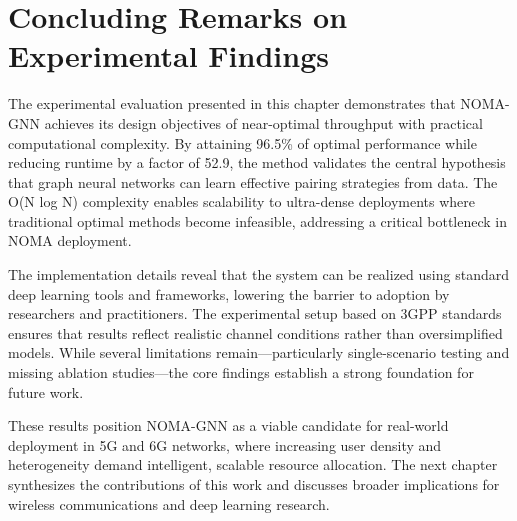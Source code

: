\section{Concluding Remarks on Experimental Findings}

The experimental evaluation presented in this chapter demonstrates that NOMA-GNN achieves its design objectives of near-optimal throughput with practical computational complexity. By attaining 96.5\% of optimal performance while reducing runtime by a factor of 52.9, the method validates the central hypothesis that graph neural networks can learn effective pairing strategies from data. The O(N log N) complexity enables scalability to ultra-dense deployments where traditional optimal methods become infeasible, addressing a critical bottleneck in NOMA deployment.

The implementation details reveal that the system can be realized using standard deep learning tools and frameworks, lowering the barrier to adoption by researchers and practitioners. The experimental setup based on 3GPP standards ensures that results reflect realistic channel conditions rather than oversimplified models. While several limitations remain—particularly single-scenario testing and missing ablation studies—the core findings establish a strong foundation for future work.

These results position NOMA-GNN as a viable candidate for real-world deployment in 5G and 6G networks, where increasing user density and heterogeneity demand intelligent, scalable resource allocation. The next chapter synthesizes the contributions of this work and discusses broader implications for wireless communications and deep learning research.
